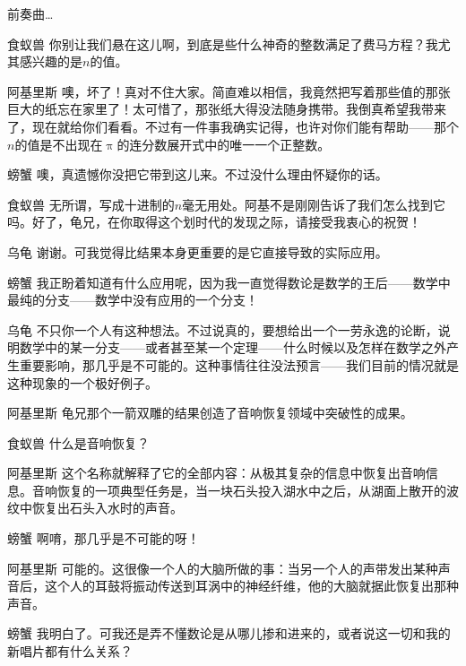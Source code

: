 \begin{dialog}{前奏曲…}
\begin{dialogue}
\item[食蚁兽]你别让我们悬在这儿啊，到底是些什么神奇的整数满足了费马方程？我尤其感兴趣的是$n$的值。

\item[阿基里斯]噢，坏了！真对不住大家。简直难以相信，我竟然把写着那些值的那张巨大的纸忘在家里了！太可惜了，那张纸大得没法随身携带。我倒真希望我带来了，现在就给你们看看。不过有一件事我确实记得，也许对你们能有帮助——那个$n$的值是不出现在$\uppi$的连分数展开式中的唯一一个正整数。

\item[螃蟹]噢，真遗憾你没把它带到这儿来。不过没什么理由怀疑你的话。

\item[食蚁兽]无所谓，写成十进制的$n$毫无用处。阿基不是刚刚告诉了我们怎么找到它吗。好了，龟兄，在你取得这个划时代的发现之际，请接受我衷心的祝贺！

\item[乌龟]谢谢。可我觉得比结果本身更重要的是它直接导致的实际应用。

\item[螃蟹]我正盼着知道有什么应用呢，因为我一直觉得数论是数学的王后——数学中最纯的分支——数学中没有应用的一个分支！

\item[乌龟]不只你一个人有这种想法。不过说真的，要想给出一个一劳永逸的论断，说明数学中的某一分支——或者甚至某一个定理——什么时候以及怎样在数学之外产生重要影响，那几乎是不可能的。这种事情往往没法预言——我们目前的情况就是这种现象的一个极好例子。

\item[阿基里斯]龟兄那个一箭双雕的结果创造了音响恢复领域中突破性的成果。

\item[食蚁兽]什么是音响恢复？

\item[阿基里斯]这个名称就解释了它的全部内容：从极其复杂的信息中恢复出音响信息。音响恢复的一项典型任务是，当一块石头投入湖水中之后，从湖面上散开的波纹中恢复出石头入水时的声音。

\item[螃蟹]啊唷，那几乎是不可能的呀！

\item[阿基里斯]可能的。这很像一个人的大脑所做的事：当另一个人的声带发出某种声音后，这个人的耳鼓将振动传送到耳涡中的神经纤维，他的大脑就据此恢复出那种声音。

\item[螃蟹]我明白了。可我还是弄不懂数论是从哪儿掺和进来的，或者说这一切和我的新唱片都有什么关系？


\end{dialogue}
\end{dialog}
